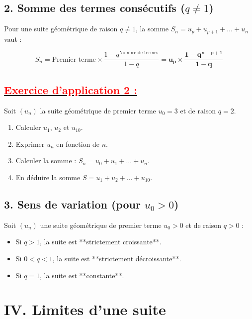 \documentclass[12pt,a4paper]{article}
\begin{document}
\subsection*{\color{myred}2. Somme des termes consécutifs ($q \neq 1$)}
Pour une suite géométrique de raison $q \neq 1$, la somme $S_n = u_p + u_{p+1} + \dots + u_n$ vaut :
\begin{tcolorbox}[colback=red!5!white,colframe=myred]
\[
S_n = \text{Premier terme} \times \dfrac{1 - q^{\text{Nombre de termes}}}{1 - q} = \mathbf{u_p \times \dfrac{1 - q^{n - p + 1}}{1 - q}}
\]
\end{tcolorbox}

\subsection*{\underline{\textbf{\textcolor{red}{Exercice d'application 2 :}}}}
Soit $(u_n)$ la suite géométrique de premier terme $u_0 = 3$ et de raison $q = 2$.
\begin{enumerate}
    \item Calculer $u_1$, $u_2$ et $u_{10}$.
    \item Exprimer $u_n$ en fonction de $n$.
    \item Calculer la somme : $S_n = u_0 + u_1 + \dots + u_n$.
    \item En déduire la somme $S = u_1 + u_2 + \dots + u_{10}$.
\end{enumerate}

\subsection*{\color{myred}3. Sens de variation (pour $u_0 > 0$)}
Soit $(u_n)$ une suite géométrique de premier terme $u_0 > 0$ et de raison $q > 0$ :
\begin{itemize}[label=$\bullet$]
    \item Si $q > 1$, la suite est **strictement croissante**.
    \item Si $0 < q < 1$, la suite est **strictement décroissante**.
    \item Si $q = 1$, la suite est **constante**.
\end{itemize}

\section*{\color{myred}IV. Limites d'une suite}
\end{document}
